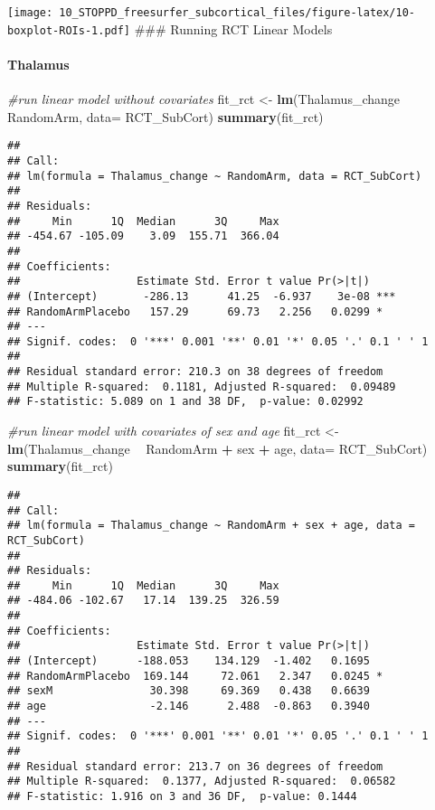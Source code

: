 \documentclass[]{article}
\newenvironment{Shaded}{\begin{snugshade}}{\end{snugshade}}
\newcommand{\KeywordTok}[1]{\textcolor[rgb]{0.13,0.29,0.53}{\textbf{#1}}}
\newcommand{\DataTypeTok}[1]{\textcolor[rgb]{0.13,0.29,0.53}{#1}}
\newcommand{\StringTok}[1]{\textcolor[rgb]{0.31,0.60,0.02}{#1}}
\newcommand{\CommentTok}[1]{\textcolor[rgb]{0.56,0.35,0.01}{\textit{#1}}}
\newcommand{\OperatorTok}[1]{\textcolor[rgb]{0.81,0.36,0.00}{\textbf{#1}}}
\newcommand{\NormalTok}[1]{#1}
\let\oldparagraph\paragraph
\renewcommand{\paragraph}[1]{\oldparagraph{#1}\mbox{}}
\theoremstyle{definition}
\theoremstyle{definition}
\theoremstyle{definition}
\theoremstyle{remark}
\begin{document}
\texttt{[image: 10\_STOPPD\_freesurfer\_subcortical\_files/figure-latex/10-boxplot-ROIs-1.pdf]}
\#\#\# Running RCT Linear Models

\paragraph{Thalamus}\label{thalamus}

\begin{Shaded}
\begin{Highlighting}[]
\CommentTok{#run linear model without covariates}
\NormalTok{  fit_rct <-}\StringTok{ }\KeywordTok{lm}\NormalTok{(Thalamus_change }\OperatorTok{~}\StringTok{ }\NormalTok{RandomArm, }\DataTypeTok{data=}\NormalTok{ RCT_SubCort)}
  \KeywordTok{summary}\NormalTok{(fit_rct)}
\end{Highlighting}
\end{Shaded}

\begin{verbatim}
## 
## Call:
## lm(formula = Thalamus_change ~ RandomArm, data = RCT_SubCort)
## 
## Residuals:
##     Min      1Q  Median      3Q     Max 
## -454.67 -105.09    3.09  155.71  366.04 
## 
## Coefficients:
##                  Estimate Std. Error t value Pr(>|t|)    
## (Intercept)       -286.13      41.25  -6.937    3e-08 ***
## RandomArmPlacebo   157.29      69.73   2.256   0.0299 *  
## ---
## Signif. codes:  0 '***' 0.001 '**' 0.01 '*' 0.05 '.' 0.1 ' ' 1
## 
## Residual standard error: 210.3 on 38 degrees of freedom
## Multiple R-squared:  0.1181, Adjusted R-squared:  0.09489 
## F-statistic: 5.089 on 1 and 38 DF,  p-value: 0.02992
\end{verbatim}

\begin{Shaded}
\begin{Highlighting}[]
\CommentTok{#run linear model with covariates of sex and age}
\NormalTok{  fit_rct <-}\StringTok{ }\KeywordTok{lm}\NormalTok{(Thalamus_change }\OperatorTok{~}\StringTok{ }\NormalTok{RandomArm }\OperatorTok{+}\StringTok{ }\NormalTok{sex }\OperatorTok{+}\StringTok{ }\NormalTok{age, }\DataTypeTok{data=}\NormalTok{ RCT_SubCort)}
  \KeywordTok{summary}\NormalTok{(fit_rct)}
\end{Highlighting}
\end{Shaded}

\begin{verbatim}
## 
## Call:
## lm(formula = Thalamus_change ~ RandomArm + sex + age, data = RCT_SubCort)
## 
## Residuals:
##     Min      1Q  Median      3Q     Max 
## -484.06 -102.67   17.14  139.25  326.59 
## 
## Coefficients:
##                  Estimate Std. Error t value Pr(>|t|)  
## (Intercept)      -188.053    134.129  -1.402   0.1695  
## RandomArmPlacebo  169.144     72.061   2.347   0.0245 *
## sexM               30.398     69.369   0.438   0.6639  
## age                -2.146      2.488  -0.863   0.3940  
## ---
## Signif. codes:  0 '***' 0.001 '**' 0.01 '*' 0.05 '.' 0.1 ' ' 1
## 
## Residual standard error: 213.7 on 36 degrees of freedom
## Multiple R-squared:  0.1377, Adjusted R-squared:  0.06582 
## F-statistic: 1.916 on 3 and 36 DF,  p-value: 0.1444
\end{verbatim}
\end{document}
